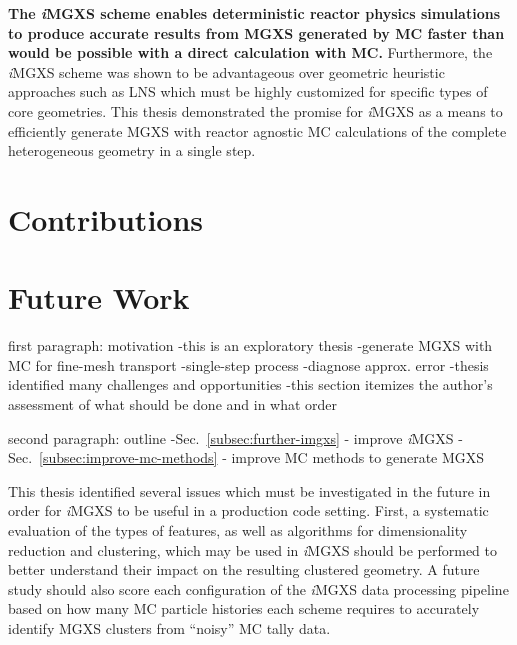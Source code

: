 
\textbf{The \textit{i}MGXS scheme enables deterministic reactor physics simulations to produce accurate results from MGXS generated by MC faster than would be possible with a direct calculation with MC.} Furthermore, the \textit{i}MGXS scheme was shown to be advantageous over geometric heuristic approaches such as LNS which must be highly customized for specific types of core geometries. This thesis demonstrated the promise for \textit{i}MGXS as a means to efficiently generate MGXS with reactor agnostic MC calculations of the complete heterogeneous geometry in a single step.

\section{Contributions}
\label{sec:chap12-contributions}


\section{Future Work}
\label{sec:chap12-future-work}

first paragraph: motivation
-this is an exploratory thesis
  -generate MGXS with MC for fine-mesh transport
  -single-step process
  -diagnose approx. error
-thesis identified many challenges and opportunities
-this section itemizes the author's assessment of what should be done and in what order

second paragraph: outline
-Sec.~\ref{subsec:further-imgxs} - improve \textit{i}\ac{MGXS}
-Sec.~\ref{subsec:improve-mc-methods} - improve \ac{MC} methods to generate \ac{MGXS}

This thesis identified several issues which must be investigated in the future in order for \textit{i}MGXS to be useful in a production code setting. First, a systematic evaluation of the types of features, as well as algorithms for dimensionality reduction and clustering, which may be used in \textit{i}MGXS should be performed to better understand their impact on the resulting clustered geometry. A future study should also score each configuration of the \textit{i}MGXS data processing pipeline based on how many MC particle histories each scheme requires to accurately identify MGXS clusters from ``noisy'' MC tally data. 


